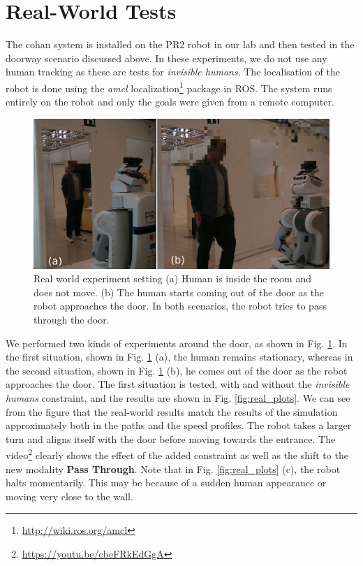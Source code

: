 \section{Real-World Tests}\label{real_chap5}
The \acrshort{cohan} system is installed on the PR2 robot in our lab and then tested in the doorway scenario discussed above. In these experiments, we do not use any human tracking as these are tests for \textit{invisible humans}. The localisation of the robot is done using the \textit{amcl} localization\footnote{\url{http://wiki.ros.org/amcl}} package in ROS. The system runs entirely on the robot and only the goals were given from a remote computer.
\begin{figure}[h!]
    \centering
    \includegraphics[width=0.9\columnwidth]{images/chapter5/real_video}
    \caption{Real world experiment setting (a) Human is inside the room and does not move. (b) The human starts coming out of the door as the robot approaches the door. In both scenarios, the robot tries to pass through the door.}
    \label{fig:real_photo}
\end{figure}

We performed two kinds of experiments around the door, as shown in Fig. \ref{fig:real_photo}. In the first situation, shown in Fig. \ref{fig:real_photo} (a), the human remains stationary, whereas in the second situation, shown in Fig. \ref{fig:real_photo} (b), he comes out of the door as the robot approaches the door. The first situation is tested, with and without the \textit{invisible humans} constraint, and the results are shown in Fig. \ref{fig:real_plots}. We can see from the figure that the real-world results match the results of the simulation approximately both in the paths and the speed profiles. The robot takes a larger turn and aligns itself with the door before moving towards the entrance. The video\footnote{\url{https://youtu.be/cbeFRkEdGgA}} clearly shows the effect of the added constraint as well as the shift to the new modality \textbf{Pass Through}. Note that in Fig. \ref{fig:real_plots} (c), the robot halts momentarily. This may be because of a sudden human appearance or moving very close to the wall.

